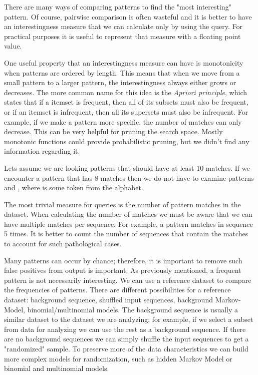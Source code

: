 There are many ways of comparing patterns to find the "most interesting" pattern. Of course, pairwise comparison is often wasteful and it is better to have an interestingness measure that we can calculate only by using the query. For practical purposes it is useful to represent that measure with a floating point value.

One useful property that an interestingness measure can have is monotonicity when patterns are ordered by length. This means that when we move from a small pattern to a larger pattern, the interestingness always either grows or decreases. The more common name for this idea is the \emph{Apriori principle}, which states that if a itemset is frequent, then all of its subsets must also be frequent, or if an itemset is infrequent, then all its supersets must also be infrequent. For example, if we make a pattern more specific, the number of matches can only decrease. This can be very helpful for pruning the search space. Mostly monotonic functions could provide probabilistic pruning, but we didn't find any information regarding it.

\begin{exmp}
Lets assume we are looking patterns that should have at least 10 matches. If we encounter a pattern  that has 8 matches then we do not have to examine patterns  and , where  is some token from the alphabet.
\end{exmp}

The most trivial measure for queries is the number of pattern matches in the dataset. When calculating the number of matches we must be aware that we can have multiple matches per sequence. For example, a pattern  matches in sequence  5 times. It is better to count the number of sequences that contain the matches to account for such pathological cases.

Many patterns can occur by chance; therefore, it is important to remove such false positives from output is important. As previously mentioned, a frequent pattern is not necessarily interesting. We can use a reference dataset to compare the frequencies of patterns. There are different possibilities for a reference dataset: background sequence, shuffled input sequences, background Markov-Model, binomial/multinomial models. The background sequence is usually a similar dataset to the dataset we are analyzing; for example, if we select a subset from data for analyzing we can use the rest as a background sequence. If there are no background sequences we can simply shuffle the input sequences to get a "randomized" sample. To preserve more of the data characteristics we can build more complex models for randomization, such as hidden Markov Model\cite{RatingMarkovModel} or binomial and multinomial models.

